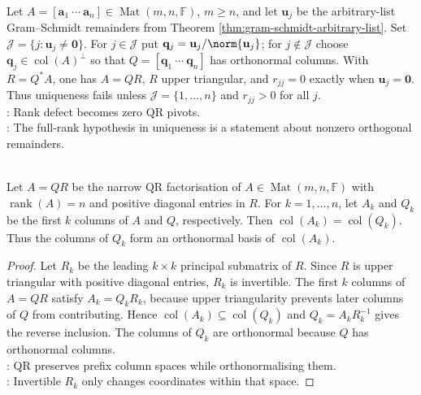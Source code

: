 \begin{perspective} \label{per:rank-deficient-gram-schmidt-qr} \\
Let $A=[\mathbf{a}_1\ \cdots\ \mathbf{a}_n]\in\operatorname{Mat}(m,n,\mathbb{F})$, $m\geq n$, and let $\mathbf{u}_j$ be the arbitrary-list Gram--Schmidt remainders from Theorem \ref{thm:gram-schmidt-arbitrary-list}. Set $\mathcal{J}=\{j:\mathbf{u}_j\neq\mathbf{0}\}$. For $j\in\mathcal{J}$ put $\mathbf{q}_j=\mathbf{u}_j/\norm{\mathbf{u}_j}$; for $j\notin\mathcal{J}$ choose $\mathbf{q}_j\in\operatorname{col}(A)^\perp$ so that $Q=[\mathbf{q}_1\ \cdots\ \mathbf{q}_n]$ has orthonormal columns. With $R=Q^*A$, one has $A=QR$, $R$ upper triangular, and $r_{jj}=0$ exactly when $\mathbf{u}_j=\mathbf{0}$. Thus uniqueness fails unless $\mathcal{J}=\{1,\ldots,n\}$ and $r_{jj}>0$ for all $j$.\\
: Rank defect becomes zero QR pivots.\\
: The full-rank hypothesis in uniqueness is a statement about nonzero orthogonal remainders.
\end{perspective}

\begin{corollary} \label{cor:qr-prefix-column-spaces} \\
Let $A=QR$ be the narrow QR factorisation of $A\in\operatorname{Mat}(m,n,\mathbb{F})$ with $\operatorname{rank}(A)=n$ and positive diagonal entries in $R$. For $k=1,\ldots,n$, let $A_k$ and $Q_k$ be the first $k$ columns of $A$ and $Q$, respectively. Then $\operatorname{col}(A_k)=\operatorname{col}(Q_k)$.\\
Thus the columns of $Q_k$ form an orthonormal basis of $\operatorname{col}(A_k)$.
\begin{proof}
Let $R_k$ be the leading $k\times k$ principal submatrix of $R$. Since $R$ is upper triangular with positive diagonal entries, $R_k$ is invertible. The first $k$ columns of $A=QR$ satisfy $A_k=Q_kR_k$, because upper triangularity prevents later columns of $Q$ from contributing. Hence $\operatorname{col}(A_k)\subseteq\operatorname{col}(Q_k)$ and $Q_k=A_kR_k^{-1}$ gives the reverse inclusion. The columns of $Q_k$ are orthonormal because $Q$ has orthonormal columns.\\
: QR preserves prefix column spaces while orthonormalising them.\\
: Invertible $R_k$ only changes coordinates within that space.
\end{proof}
\end{corollary}

